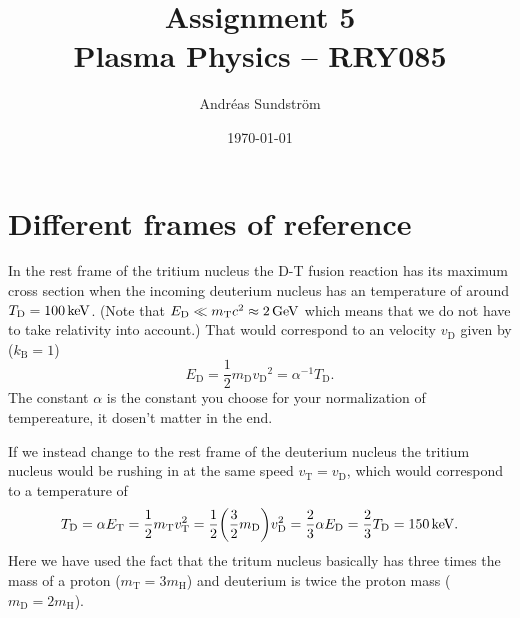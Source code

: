 \documentclass[11pt,a4paper, 
swedish, english %
]{article}
\newcommand{\kB}{\ensuremath{k_{\text{B}}}}
\newcommand{\mH}{\ensuremath{m_{\text{H}}}}
\newcommand{\vD}{\ensuremath{v_{\text{D}}}}
\newcommand{\TD}{\ensuremath{T_{\text{D}}}}
\newcommand{\ED}{\ensuremath{E_{\text{D}}}}
\newcommand{\mD}{\ensuremath{m_{\text{D}}}}
\newcommand{\vT}{\ensuremath{v_{\text{T}}}}
\newcommand{\ET}{\ensuremath{E_{\text{T}}}}
\newcommand{\mT}{\ensuremath{m_{\text{T}}}}
\begin{document}


\title{Assignment 5 \\
{\Large Plasma Physics -- RRY085}}
\author{Andréas Sundström}
\date\today%

\maketitle


\section{Different frames of reference}
In the rest frame of the tritium nucleus the D-T fusion reaction has
its maximum cross section when the incoming deuterium nucleus has an
temperature of around $\TD=\unit[100]{keV}$.
(Note that $\ED\ll\mT c^2\approx\unit[2]{GeV}$ which means that we do
not have to take relativity into account.) That would correspond to an
velocity $\vD$ given by ($\kB=1$)
\begin{equation}
\ED=\frac{1}{2}\mD\vD^2=\alpha^{-1}\TD.
\end{equation}
The constant $\alpha$ is the constant you choose for your
normalization of tempereature, it dosen't matter in the end.

If we instead change to the rest frame of the deuterium nucleus the
tritium nucleus would be rushing in at the same speed $\vT=\vD$, which
would correspond to a temperature of
\begin{equation}
\TD = \alpha \ET = \frac{1}{2}\mT\vT^2
= \frac{1}{2}\qty(\frac{3}{2}\mD)\vD^2 
= \frac{2}{3}\alpha\ED = \frac{2}{3}\TD= \unit[150]{keV}.
\end{equation}
Here we have used the fact that the tritum nucleus basically has
three times the mass of a proton ($\mT=3\mH$) and deuterium is twice
the proton mass ($\mD=2\mH$).
\end{document}
